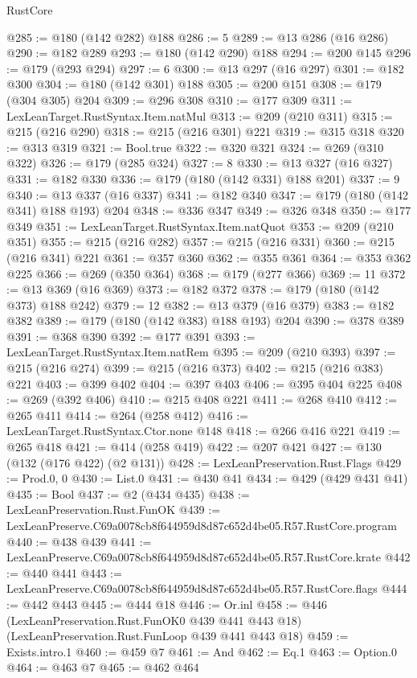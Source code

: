 \begin{lexlean}{RustCore}
\begin{coremodule}
@285 := @180 (@142 @282) @188
@286 := 5
@289 := @13 @286 (@16 @286)
@290 := @182 @289
@293 := @180 (@142 @290) @188
@294 := @200 @145
@296 := @179 (@293 @294)
@297 := 6
@300 := @13 @297 (@16 @297)
@301 := @182 @300
@304 := @180 (@142 @301) @188
@305 := @200 @151
@308 := @179 (@304 @305) @204
@309 := @296 @308
@310 := @177 @309
@311 := LexLeanTarget.RustSyntax.Item.natMul
@313 := @209 (@210 @311)
@315 := @215 (@216 @290)
@318 := @215 (@216 @301) @221
@319 := @315 @318
@320 := @313 @319
@321 := Bool.true
@322 := @320 @321
@324 := @269 (@310 @322)
@326 := @179 (@285 @324)
@327 := 8
@330 := @13 @327 (@16 @327)
@331 := @182 @330
@336 := @179 (@180 (@142 @331) @188 @201)
@337 := 9
@340 := @13 @337 (@16 @337)
@341 := @182 @340
@347 := @179 (@180 (@142 @341) @188 @193) @204
@348 := @336 @347
@349 := @326 @348
@350 := @177 @349
@351 := LexLeanTarget.RustSyntax.Item.natQuot
@353 := @209 (@210 @351)
@355 := @215 (@216 @282)
@357 := @215 (@216 @331)
@360 := @215 (@216 @341) @221
@361 := @357 @360
@362 := @355 @361
@364 := @353 @362 @225
@366 := @269 (@350 @364)
@368 := @179 (@277 @366)
@369 := 11
@372 := @13 @369 (@16 @369)
@373 := @182 @372
@378 := @179 (@180 (@142 @373) @188 @242)
@379 := 12
@382 := @13 @379 (@16 @379)
@383 := @182 @382
@389 := @179 (@180 (@142 @383) @188 @193) @204
@390 := @378 @389
@391 := @368 @390
@392 := @177 @391
@393 := LexLeanTarget.RustSyntax.Item.natRem
@395 := @209 (@210 @393)
@397 := @215 (@216 @274)
@399 := @215 (@216 @373)
@402 := @215 (@216 @383) @221
@403 := @399 @402
@404 := @397 @403
@406 := @395 @404 @225
@408 := @269 (@392 @406)
@410 := @215 @408 @221
@411 := @268 @410
@412 := @265 @411
@414 := @264 (@258 @412)
@416 := LexLeanTarget.RustSyntax.Ctor.none @148
@418 := @266 @416 @221
@419 := @265 @418
@421 := @414 (@258 @419)
@422 := @207 @421
@427 := @130 (@132 (@176 @422) (@2 @131))
@428 := LexLeanPreservation.Rust.Flags
@429 := Prod.{0, 0}
@430 := List.{0}
@431 := @430 @41
@434 := @429 (@429 @431 @41)
@435 := Bool
@437 := @2 (@434 @435)
@438 := LexLeanPreservation.Rust.FunOK
@439 := LexLeanPreserve.C69a0078cb8f644959d8d87c652d4be05.R57.RustCore.program
@440 := @438 @439
@441 := LexLeanPreserve.C69a0078cb8f644959d8d87c652d4be05.R57.RustCore.krate
@442 := @440 @441
@443 := LexLeanPreserve.C69a0078cb8f644959d8d87c652d4be05.R57.RustCore.flags
@444 := @442 @443
@445 := @444 @18
@446 := Or.inl
@458 := @446
    (LexLeanPreservation.Rust.FunOK0 @439 @441 @443 @18)
    (LexLeanPreservation.Rust.FunLoop @439 @441 @443 @18)
@459 := Exists.intro.{1}
@460 := @459 @7
@461 := And
@462 := Eq.{1}
@463 := Option.{0}
@464 := @463 @7
@465 := @462 @464

\end{coremodule}
\end{lexlean}

